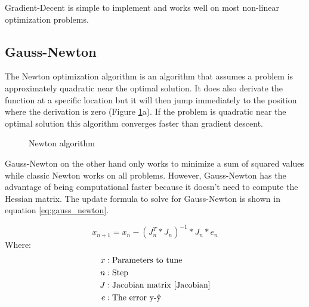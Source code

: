 \documentclass[11pt,a4paper,titlepage,oneside]{report}
\begin{document}
Gradient-Decent is simple to implement and works well on most non-linear optimization problems.

\subsection{Gauss-Newton}
The Newton optimization algorithm is an algorithm that assumes a problem is approximately quadratic near the optimal solution. It does also derivate the function at a specific location but it will then jump immediately to the position where the derivation is zero (Figure \ref{fig:newton}a). If the problem is quadratic near the optimal solution this algorithm converges faster than gradient descent.

\begin{figure}[H]
	\centering
	\qquad
	\caption{Newton algorithm}
	\label{fig:newton}
\end{figure}

Gauss-Newton on the other hand only works to minimize a sum of squared values while classic Newton works on all problems. However, Gauss-Newton has the advantage of being computational faster \cite{gauss_newton} because it doesn't need to compute the Hessian matrix. The update formula to solve for Gauss-Newton is shown in equation \ref{eq:gauss_newton}.

\begin{equation}\label{eq:gauss_newton}
  x_{n+1} = x_n - (J_n^T*J_n)^{-1}*J_n*e_n
\end{equation}
Where:
\begin{align*}
  x		  &: \text{Parameters to tune}\\
  n		  &: \text{Step}\\
	J		  &: \text{Jacobian matrix \cite{Jacobian}}\\
  e  	  &: \text{The error y-ŷ}
\end{align*}
\end{document}
